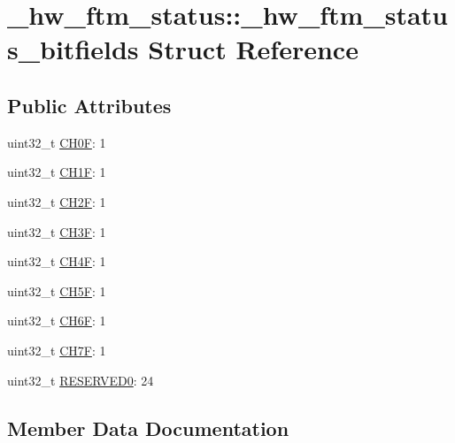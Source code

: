 \hypertarget{struct__hw__ftm__status_1_1__hw__ftm__status__bitfields}{}\section{\+\_\+hw\+\_\+ftm\+\_\+status\+:\+:\+\_\+hw\+\_\+ftm\+\_\+status\+\_\+bitfields Struct Reference}
\label{struct__hw__ftm__status_1_1__hw__ftm__status__bitfields}
\subsection*{Public Attributes}
\begin{DoxyCompactItemize}
\item 
uint32\+\_\+t \hyperlink{struct__hw__ftm__status_1_1__hw__ftm__status__bitfields_a5659a1182613a41af1e84aafa7dbd4b6}{C\+H0F}\+: 1
\item 
uint32\+\_\+t \hyperlink{struct__hw__ftm__status_1_1__hw__ftm__status__bitfields_aa28fa0106d580b3db64b30c71fe9e159}{C\+H1F}\+: 1
\item 
uint32\+\_\+t \hyperlink{struct__hw__ftm__status_1_1__hw__ftm__status__bitfields_a6328f47cecbcab1dc02b5c3be67e2a0a}{C\+H2F}\+: 1
\item 
uint32\+\_\+t \hyperlink{struct__hw__ftm__status_1_1__hw__ftm__status__bitfields_adbf237ab0626a90bfbd0eba05cb2c388}{C\+H3F}\+: 1
\item 
uint32\+\_\+t \hyperlink{struct__hw__ftm__status_1_1__hw__ftm__status__bitfields_aae900071dd2dab1c16a3a9d40bc3468f}{C\+H4F}\+: 1
\item 
uint32\+\_\+t \hyperlink{struct__hw__ftm__status_1_1__hw__ftm__status__bitfields_a1d777c654d6040ac4fa9eb7a194b3c04}{C\+H5F}\+: 1
\item 
uint32\+\_\+t \hyperlink{struct__hw__ftm__status_1_1__hw__ftm__status__bitfields_a2bafbccce101cd6487e1dc56f6251de8}{C\+H6F}\+: 1
\item 
uint32\+\_\+t \hyperlink{struct__hw__ftm__status_1_1__hw__ftm__status__bitfields_adb2e582e2c73efb6b107cad9334ed604}{C\+H7F}\+: 1
\item 
uint32\+\_\+t \hyperlink{struct__hw__ftm__status_1_1__hw__ftm__status__bitfields_a4c6f247d32c52caf34ba2b113a7f42cb}{R\+E\+S\+E\+R\+V\+E\+D0}\+: 24
\end{DoxyCompactItemize}


\subsection{Member Data Documentation}
